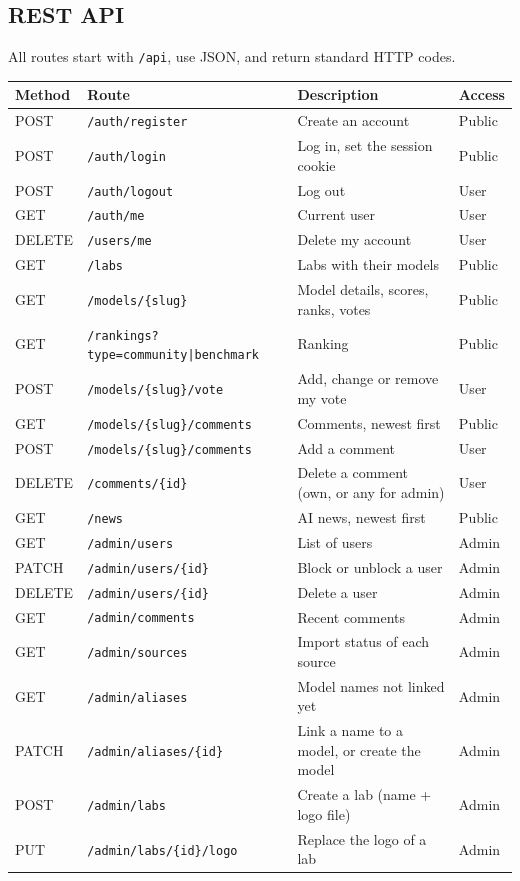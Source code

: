 \documentclass[11pt,a4paper]{article}
\begin{document}
\subsection{REST API}

All routes start with \texttt{/api}, use JSON, and return standard HTTP codes.

\begin{center}
\small
\begin{tabularx}{\textwidth}{llXl}
  \toprule
  \textbf{Method} & \textbf{Route} & \textbf{Description} & \textbf{Access} \\
  \midrule
  POST & \texttt{/auth/register} & Create an account & Public \\
  POST & \texttt{/auth/login} & Log in, set the session cookie & Public \\
  POST & \texttt{/auth/logout} & Log out & User \\
  GET & \texttt{/auth/me} & Current user & User \\
  DELETE & \texttt{/users/me} & Delete my account & User \\
  GET & \texttt{/labs} & Labs with their models & Public \\
  GET & \texttt{/models/\{slug\}} & Model details, scores, ranks, votes & Public \\
  GET & \texttt{/rankings?type=community|benchmark} & Ranking & Public \\
  POST & \texttt{/models/\{slug\}/vote} & Add, change or remove my vote & User \\
  GET & \texttt{/models/\{slug\}/comments} & Comments, newest first & Public \\
  POST & \texttt{/models/\{slug\}/comments} & Add a comment & User \\
  DELETE & \texttt{/comments/\{id\}} & Delete a comment (own, or any for admin) & User \\
  GET & \texttt{/news} & AI news, newest first & Public \\
  GET & \texttt{/admin/users} & List of users & Admin \\
  PATCH & \texttt{/admin/users/\{id\}} & Block or unblock a user & Admin \\
  DELETE & \texttt{/admin/users/\{id\}} & Delete a user & Admin \\
  GET & \texttt{/admin/comments} & Recent comments & Admin \\
  GET & \texttt{/admin/sources} & Import status of each source & Admin \\
  GET & \texttt{/admin/aliases} & Model names not linked yet & Admin \\
  PATCH & \texttt{/admin/aliases/\{id\}} & Link a name to a model, or create the model & Admin \\
  POST & \texttt{/admin/labs} & Create a lab (name + logo file) & Admin \\
  PUT & \texttt{/admin/labs/\{id\}/logo} & Replace the logo of a lab & Admin \\
  \bottomrule
\end{tabularx}
\end{center}
\end{document}
